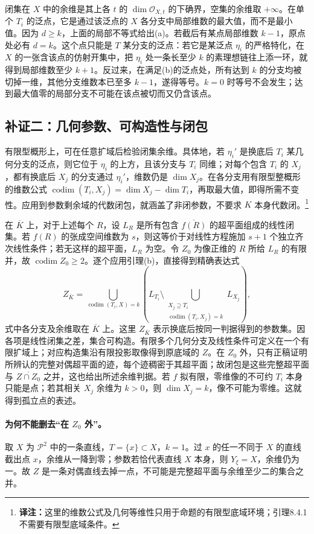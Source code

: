 \documentclass[UTF8,a4paper]{ctexbook}
\newcommand{\transnote}[1]{\ifhmode\unskip\nobreak\fi\footnote{\textbf{译注：}#1}}
\newcommand{\OO}{\mathscr O}
\newcommand{\PP}{\mathscr P}
\DeclareMathOperator{\codim}{codim}
\begin{document}
闭集在 $X$ 中的余维是其上各 $t$ 的 $\dim\OO_{X,t}$ 的下确界，空集的余维取 $+\infty$。在单个 $T_i$ 的泛点，它是通过该泛点的 $X$ 各分支中局部维数的最大值，而不是最小值。因为 $d\ge k$，上面的局部不等式给出(a)。若截后有某点局部维数 $k-1$，原点处必有 $d=k$。这个点只能是 $T$ 某分支的泛点：若它是某泛点 $\eta_i$ 的严格特化，在 $X$ 的一张含该点的仿射开集中，把 $\eta_i$ 处一条长至少 $k$ 的素理想链往上添一环，就得到局部维数至少 $k+1$。反过来，在满足(b)的泛点处，所有达到 $k$ 的分支均被切掉一维，其他分支维数本已至多 $k-1$，遂得等号。$k=0$ 时等号不会发生；达到最大值零的局部分支不可能在该点被切而又仍含该点。


\subsection*{补证二：几何参数、可构造性与闭包}
有限型概形上，可在任意扩域后检验闭集余维。具体地，若 $\eta_i'$ 是换底后 $T_i$ 某几何分支的泛点，则它位于 $\eta_i$ 的上方，且该分支与 $T_i$ 同维；对每个包含 $T_i$ 的 $X_j$，都有换底后 $X_j$ 的分支通过 $\eta_i'$，维数仍是 $\dim X_j$。在各分支用有限型整概形的维数公式 $\codim(T_i,X_j)=\dim X_j-\dim T_i$，再取最大值，即得所需不变性。应用到参数剩余域的代数闭包，就涵盖了非闭参数，不要求 $K$ 本身代数闭。\transnote{这里的维数公式及几何等维性只用于命题的有限型底域环境；引理8.4.1不需要有限型底域条件。}

在 $\overline K$ 上，对于上述每个 $R$，设 $L_R$ 是所有包含 $\overline{f(R)}$ 的超平面组成的线性闭集。若 $f(R)$ 的张成空间维数为 $s$，则这等价于对线性方程施加 $s+1$ 个独立齐次线性条件；若无这样的超平面，$L_R$ 为空。令 $Z_0$ 为像正维的 $R$ 所给 $L_R$ 的有限并，故 $\codim Z_0\ge2$。逐个应用引理(b)，直接得到精确表达式
\[
 Z_{\overline K}=
 \bigcup_{\codim(T_i,X)=k}
 \left(L_{T_i}\setminus
 \bigcup_{\substack{X_j\supseteq T_i\\\codim(T_i,X_j)=k}} L_{X_j}\right),
\]
式中各分支及余维取在 $\overline K$ 上。这里 $Z_{\overline K}$ 表示换底后按同一判据得到的参数集。因各项是线性闭集之差，集合可构造。有限多个几何分支及线性条件可定义在一个有限扩域上；对应构造集沿有限投影取像得到原底域的 $Z$。在 $Z_0$ 外，只有正稿证明所辨认的完整对偶超平面的迹，每个迹稠密于其超平面；故闭包是这些完整超平面与 $\overline{Z\cap Z_0}$ 之并，这也给出所述余维判据。若 $f$ 拟有限，零维像的不可约 $T_i$ 本身只能是点；若其相关 $X_j$ 余维为 $k>0$，则 $\dim X_j=k$，像不可能为零维。这就得到孤立点的表述。

\paragraph{为何不能删去“在 $Z_0$ 外”。}
取 $X$ 为 $\PP^2$ 中的一条直线，$T=\{x\}\subset X$，$k=1$。过 $x$ 的任一不同于 $X$ 的直线截出点 $x$，余维从一降到零；参数若恰代表直线 $X$ 本身，则 $Y_\xi=X$，余维仍为一。故 $Z$ 是一条对偶直线去掉一点，不可能是完整超平面与余维至少二的集合之并。
\end{document}
